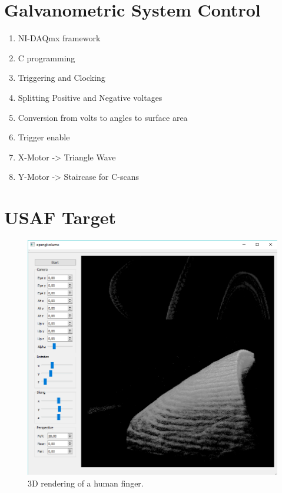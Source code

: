 \section{Galvanometric System Control}
	\begin{enumerate}
		\item NI-DAQmx framework
		\item C programming
		\item Triggering and Clocking
		\item Splitting Positive and Negative voltages
		\item Conversion from volts to angles to surface area
		\item Trigger enable
		\item X-Motor -> Triangle Wave
		\item Y-Motor -> Staircase for C-scans		
	\end{enumerate}

\section{USAF Target}
    \begin{figure}[hbt]
        \centering
        \includegraphics[width=0.8\linewidth]{gfx/3d/finger}
        \caption[]{3D rendering of a human finger.}\label{fig:finger-3d}
    \end{figure}

